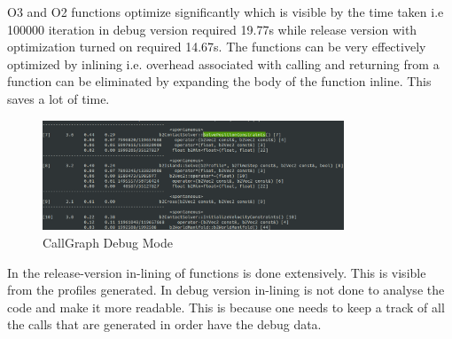 \documentclass[a4paper,11pt]{article}
\begin{document}
O3 and O2 functions optimize significantly which is visible by the time taken i.e 100000 iteration in debug version required 19.77s while release version with optimization turned on required 14.67s.
The functions can be very effectively optimized by inlining i.e. overhead associated with calling and returning from a function can be eliminated by expanding the body of the function inline. This saves a lot of time.\\
\begin{figure}[ht]
	\begin{minipage}[ht]{0.5\linewidth}
	\includegraphics[width=90mm]{1.eps}
	\caption{CallGraph Debug Mode}	
	\end{minipage}	
	\end{figure}

In the release-version in-lining of functions is done extensively. This is visible from the profiles generated. In debug version in-lining is not done to analyse the code and make it more readable. This is because one needs to keep a track of all the calls that are generated in order have the debug data.\\
\end{document}
